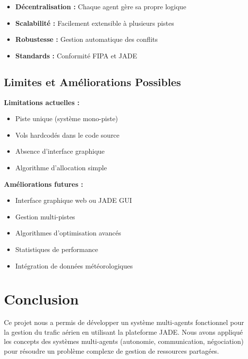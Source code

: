 \documentclass[12pt,a4paper]{article}
\begin{document}
\begin{itemize}[leftmargin=*]
    \item[\color{primaryblue}$\blacksquare$] \textbf{Décentralisation :} Chaque agent gère sa propre logique
    \item[\color{primaryblue}$\blacksquare$] \textbf{Scalabilité :} Facilement extensible à plusieurs pistes
    \item[\color{primaryblue}$\blacksquare$] \textbf{Robustesse :} Gestion automatique des conflits
    \item[\color{primaryblue}$\blacksquare$] \textbf{Standards :} Conformité FIPA et JADE
\end{itemize}

\subsection{Limites et Améliorations Possibles}

\textbf{Limitations actuelles :}
\begin{itemize}[leftmargin=*]
    \item Piste unique (système mono-piste)
    \item Vols hardcodés dans le code source
    \item Absence d'interface graphique
    \item Algorithme d'allocation simple
\end{itemize}

\textbf{Améliorations futures :}
\begin{itemize}[leftmargin=*]
    \item Interface graphique web ou JADE GUI
    \item Gestion multi-pistes
    \item Algorithmes d'optimisation avancés
    \item Statistiques de performance
    \item Intégration de données météorologiques
\end{itemize}

\section{Conclusion}

Ce projet nous a permis de développer un système multi-agents fonctionnel pour la gestion du trafic aérien en utilisant la plateforme JADE. Nous avons appliqué les concepts des systèmes multi-agents (autonomie, communication, négociation) pour résoudre un problème complexe de gestion de ressources partagées.
\end{document}

